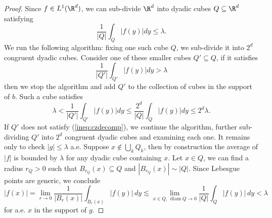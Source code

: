 \documentclass[reqno]{amsart}
\theoremstyle{definition}
\theoremstyle{remark}
\begin{document}
\begin{proof}
	Since $f \in L^1 (\R^d)$, we can sub-divide $\R^d$ into dyadic cubes $Q \subseteq \R^d$ satisfying
		\[ \frac{1}{|Q|} \int_Q |f(y)| dy \leq \lambda. \]
	We run the following algorithm: fixing one such cube $Q$, we sub-divide it into $2^d$ congruent dyadic cubes. Consider one of these smaller cubes $Q' \subseteq Q$, if it satisfies 
		\begin{equation}
			\frac{1}{|Q'|} \int_{Q'} |f(y)| dy > \lambda
			\tag{*}
			\label{ineq:czdecomp} 
		\end{equation}	
	then we stop the algorithm and add $Q'$ to the collection of cubes in the support of $b$. Such a cube satisfies
		\[ \lambda <\frac{1}{|Q'|} \int_{Q'} |f(y)| dy \leq \frac{2^d}{|Q|} \int_Q |f(y)| dy \leq 2^d \lambda.  \]
	If $Q'$ does not satisfy (\ref{ineq:czdecomp}), we continue the algorithm, further sub-dividing $Q'$ into $2^d$ congruent dyadic cubes and examining each one. It remains only to check $|g| \leq \lambda$ a.e. Suppose $x \not\in \bigcup_k Q_k$, then by construction the average of $|f|$ is bounded by $\lambda$ for any dyadic cube containing $x$. Let $x \in Q$, we can find a radius $r_Q > 0$ such that $B_{r_Q} (x) \subseteq Q$ and $|B_{r_Q} (x)| \sim |Q|$. Since Lebesgue points are generic, we conclude
		\[ |f(x)| = \lim_{r \to 0} \frac{1}{|B_r(x)|} \int_{B_r (x)} |f(y)| \, dy \lesssim \lim_{x \in Q,  \, \operatorname{diam} Q \to 0}\frac{1}{|Q|} \int_Q |f(y)| \, dy < \lambda\]
	for a.e. $x$ in the support of $g$. 
\end{proof}
\end{document}
